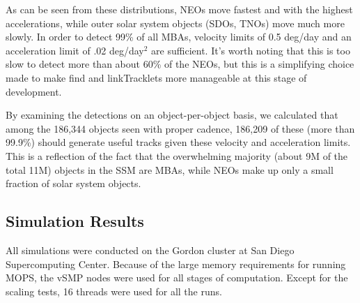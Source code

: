 As can be seen from these distributions, NEOs move fastest and with
the highest accelerations, while outer solar system objects (SDOs,
TNOs) move much more slowly.  In order to detect 99\% of all MBAs,
velocity limits of 0.5 deg/day and an acceleration limit of 
.02 deg/day$^2$ are sufficient. It's worth noting that this is too
slow to detect more than about 60\% of the NEOs, but this is a
simplifying choice made to make find and linkTracklets more manageable
at this stage of development. 

By examining the detections on an object-per-object basis, we
calculated that among the 186,344 objects seen with proper cadence,
186,209 of these (more than 99.9\%) should generate useful tracks
given these velocity and acceleration limits. This is a reflection of
the fact that the overwhelming majority (about 9M of the total 11M)
objects in the SSM are MBAs, while NEOs make up only a small fraction
of solar system objects.


\subsection{Simulation Results}

All simulations were conducted on the Gordon cluster at San Diego
Supercomputing Center.  Because of the large memory requirements for
running MOPS, the vSMP nodes were used for all stages of computation.
Except for the scaling tests, 16 threads were used for all the runs.


